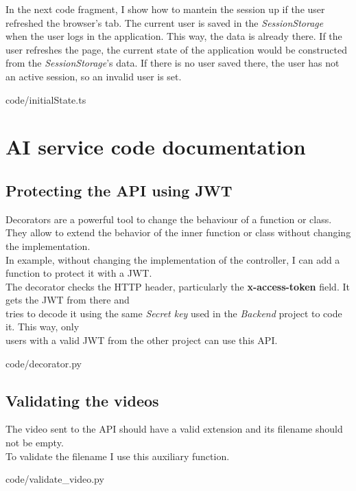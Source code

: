         In the next code fragment, I show how to mantein the session up if the user refreshed the browser's tab. The current user is saved in the \textit{SessionStorage} \\
        when the user logs in the application. This way, the data is already there. If the user refreshes the page, the current state of the application would be constructed \\
        from the \textit{SessionStorage}'s data. If there is no user saved there, the user has not an active session, so an invalid user is set.
        
        {code/initialState.ts}

\newpage
\section{AI service code documentation}
    \subsection{Protecting the API using JWT}
        Decorators \cite{Decorator} are a powerful tool to change the behaviour of a function or class. \\
        They allow to extend the behavior of the inner function or class without changing the implementation. \\

        In example, without changing the implementation of the controller, I can add a function to protect it with a JWT. \\
        The decorator checks the HTTP header, particularly the \textbf{x-access-token} field. It gets the JWT from there and \\
        tries to decode it using the same \textit{Secret key} used in the \textit{Backend} project to code it. This way, only \\
        users with a valid JWT from the other project can use this API.
        
        {code/decorator.py}

    \subsection{Validating the videos}
        The video sent to the API should have a valid extension and its filename should not be empty. \\
        To validate the filename I use this auxiliary function. 
        
        {code/validate_video.py}

